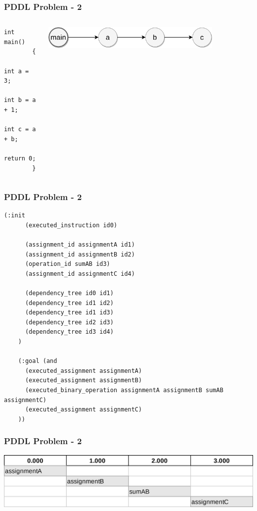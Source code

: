\documentclass{beamer}
\begin{document}
\begin{frame}[fragile]
  \frametitle{PDDL Problem - 2}

  \begin{columns}
    \begin{column}{0.35\textwidth}
      \begin{lstlisting}[style=cppStyle]
        int main()
        {
          int a = 3;
          int b = a + 1;
          int c = a + b;
          return 0;
        }
      \end{lstlisting}
    \end{column}
    \begin{column}{0.65\textwidth}
      \begin{center}
        \includegraphics[width=0.8\textwidth]{../images/dependency-tree-NotParallel.png}
      \end{center}
    \end{column}
  \end{columns}
\end{frame}

\begin{frame}[fragile]
  \frametitle{PDDL Problem - 2}

  \begin{lstlisting}[style=pddlStyle,basicstyle=\ttfamily\fontsize{10pt}{10pt}\selectfont]
    (:init
      (executed_instruction id0)

      (assignment_id assignmentA id1)
      (assignment_id assignmentB id2)
      (operation_id sumAB id3)
      (assignment_id assignmentC id4)
      
      (dependency_tree id0 id1)
      (dependency_tree id1 id2)
      (dependency_tree id1 id3)
      (dependency_tree id2 id3)
      (dependency_tree id3 id4)
    )

    (:goal (and
      (executed_assignment assignmentA)
      (executed_assignment assignmentB)
      (executed_binary_operation assignmentA assignmentB sumAB assignmentC)
      (executed_assignment assignmentC)
    ))
  \end{lstlisting}
\end{frame}

\begin{frame}[fragile]
  \frametitle{PDDL Problem - 2}

  \includegraphics[width=1\textwidth]{../images/parallel-tasks-NotParallel.png}
\end{frame}
\end{document}
